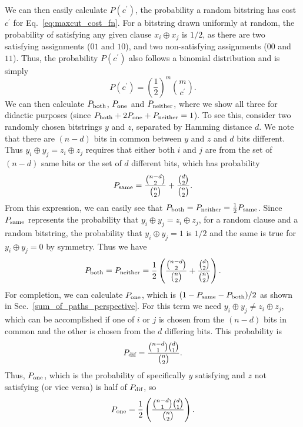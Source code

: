 \documentclass[superscriptaddress,pra,aps,10pt,longbibliography,notitlepage]{revtex4-1}
\newcommand{\Prob}[1]{\ensuremath{P_{\textnormal{#1}}}}
\newcommand{\Psame}{\Prob{same}}
\newcommand{\Pboth}{\Prob{both}}
\newcommand{\Pone}{\Prob{one}}
\newcommand{\Pneither}{\Prob{neither}}
\newcommand{\Pdif}{\Prob{dif}}
\newcommand*\cp{c^\prime}
\begin{document}
We can then easily calculate $P(\cp)$, the probability a random bitstring has cost $\cp$ for Eq.~\eqref{eq:maxcut_cost_fn}. For a bitstring drawn uniformly at random, the probability of satisfying any given clause $x_i \oplus x_j$ is $1/2$, as there are two satisfying assignments ($01$ and $10$), and two non-satisfying assignments ($00$ and $11$). Thus, the probability $P(\cp)$ also follows a binomial distribution and is simply
\begin{equation}\label{eq:pc_maxcut}
    P(\cp) = \left(\frac{1}{2}\right)^m \binom{m}{\cp}.
\end{equation}
We can then calculate $\Pboth$, $\Pone$ and $\Pneither$, where we show all three for didactic purposes (since $\Pboth + 2\Pone + \Pneither =1$). To see this, consider two randomly chosen bitstrings $y$ and $z$, separated by Hamming distance $d$. We note that there are $(n-d)$ bits in common between $y$ and $z$ and $d$ bits different. Thus $y_i \oplus y_j = z_i \oplus z_j$ requires that either both $i$ and $j$ are from the set of $(n-d)$ same bits or the set of $d$ different bits, which has probability
\begin{equation}
    \Psame = \frac{\binom{n-d}{2}}{\binom{n}{2}} + \frac{\binom{d}{2}}{\binom{n}{2}}.
\end{equation}
From this expression, we can easily see that $\Pboth=\Pneither=\frac{1}{2}\Psame$. Since $\Psame$ represents the probability that $y_i \oplus y_j = z_i \oplus z_j$, for a random clause and a random bitstring, the probability that $y_i \oplus y_j=1$ is $1/2$ and the same is true for $y_i \oplus y_j=0$ by symmetry. Thus we have
\begin{equation}
    \Pboth =  \Pneither = \frac{1}{2} \left( \frac{\binom{n-d}{2}}{\binom{n}{2}} + \frac{\binom{d}{2}}{\binom{n}{2}} \right).
\end{equation}
For completion, we can calculate $\Pone$, which is $(1-\Psame-\Pboth)/2$ as shown in Sec.~\ref{sum_of_paths_perspective}. For this term we need $y_i \oplus y_j \neq z_i \oplus z_j$, which can be accomplished if one of $i$ or $j$ is chosen from the $(n-d)$ bits in common and the other is chosen from the $d$ differing bits. This probability is 
\begin{equation}
    \Pdif = \frac{\binom{n-d}{1}\binom{d}{1}}{\binom{n}{2}}.
\end{equation}
Thus, $\Pone$, which is the probability of specifically $y$ satisfying and $z$ not satisfying (or vice versa) is half of $\Pdif$, so
\begin{equation}
    \Pone = \frac{1}{2} \left( \frac{\binom{n-d}{1}\binom{d}{1}}{\binom{n}{2}} \right).
\end{equation}
\end{document}
